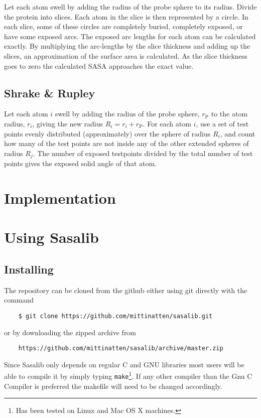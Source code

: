 \documentclass[a4paper,11pt]{article}
\begin{document}
Let each atom swell by adding the radius of the probe sphere to its
radius.  Divide the protein into slices. Each atom in the slice is
then represented by a circle. In each slice, some of these circles are
completely buried, completely exposed, or have some exposed arcs. The
exposed arc lengths for each atom can be calculated exactly. By
multiplying the arc-lengths by the slice thickness and adding up the
slices, an approximation of the surface area is calculated. As the
slice thickness goes to zero the calculated SASA approaches the exact
value.

\subsection{Shrake \& Rupley}

Let each atom $i$ swell by adding the radius of the probe sphere,
$r_\text{P}$ to the atom radius, $r_i$, giving the new radius $R_i =
r_i + r_\text{P}$. For each atom $i$, use a set of test points evenly
distributed (approximately) over the sphere of radius $R_i$, and count
how many of the test points are not inside any of the other extended
spheres of radius $R_j$. The number of exposed testpoints divided by
the total number of test points gives the exposed solid angle of that
atom.

\section{Implementation}

\section{Using Sasalib}

\subsection{Installing}

The repository can be cloned from the github either using git
directly with the command
\begin{verbatim}
    $ git clone https://github.com/mittinatten/sasalib.git
\end{verbatim}
or by downloading the zipped archive from
\begin{verbatim}
    https://github.com/mittinatten/sasalib/archive/master.zip
\end{verbatim}
Since Sasalib only depends on regular C and GNU libraries most users
will be able to compile it by simply typing \texttt{make}\footnote{Has
  been tested on Linux and Mac OS X machines.}. If any other compiler
than the Gnu C Compiler is preferred the makefile will need to be
changed accordingly.
\end{document}
